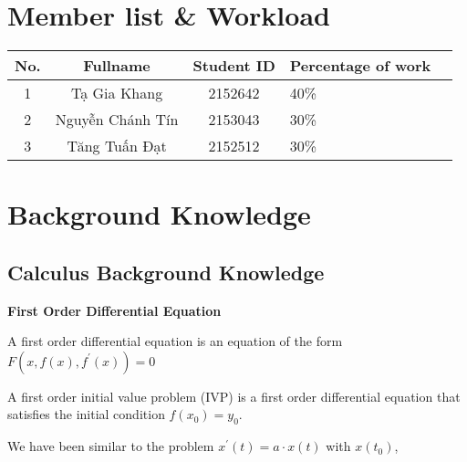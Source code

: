 \documentclass[a4paper]{article}
\begin{document}

\newpage
\tableofcontents
\newpage


\section{Member list \& Workload}

\begin{center}
\begin{tabular}{|c|c|c|l|c|}
\hline
\textbf{No.} & \textbf{Fullname} & \textbf{Student ID}  & \textbf{Percentage of work}\\
\hline 
\multirow{3}{*}{1} & \multirow{3}{*}{Tạ Gia Khang} & \multirow{3}{*}{2152642} &  \multirow{3}{*}{40\%}\\
 & &  & &\\
 & &  &&\\
\hline 
\multirow{3}{*}{2} & \multirow{3}{*}{Nguyễn Chánh Tín} & \multirow{3}{*}{2153043} & \multirow{3}{*}{30\%}\\
 & &  & \\
 & &  & \\
\hline
\multirow{3}{*}{3} & \multirow{3}{*}{Tăng Tuấn Đạt} & \multirow{3}{*}{2152512} &  \multirow{3}{*}{30\%}\\
 & &  &\\
 & &  & \\
\hline
\end{tabular}
\end{center}

\section{Background Knowledge}
	\subsection{Calculus Background Knowledge}
\enskip \enskip \enskip \textbf{First Order Differential Equation}

A first order differential equation is an equation of the form $F\left(x, f(x), f^{\prime}(x)\right)=0$

A first order initial value problem (IVP) is a first order differential equation that satisfies the initial condition $f\left(x_{0}\right)=y_{0}$.

We have been similar to the problem $x^{\prime}(t)=a \cdot x(t)$ with $x\left(t_{0}\right)$,
\end{document}
